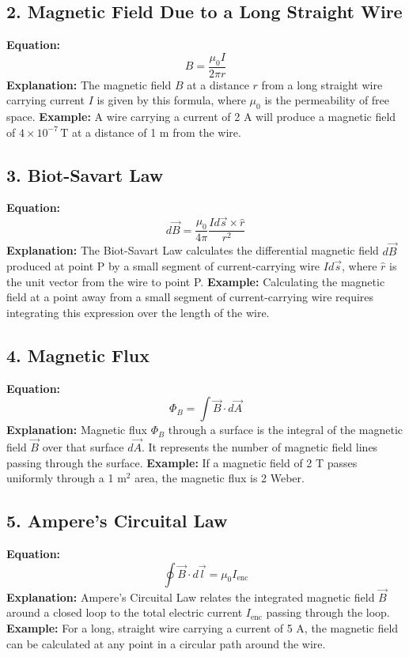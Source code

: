 \documentclass{article}
\begin{document}
\subsection*{2. Magnetic Field Due to a Long Straight Wire}
\textbf{Equation:} 
\[ B = \frac{\mu_0 I}{2\pi r} \]
\textbf{Explanation:} 
The magnetic field \( B \) at a distance \( r \) from a long straight wire carrying current \( I \) is given by this formula, where \( \mu_0 \) is the permeability of free space.
\textbf{Example:}
A wire carrying a current of 2 A will produce a magnetic field of \( 4 \times 10^{-7} \, \text{T} \) at a distance of 1 m from the wire.

\subsection*{3. Biot-Savart Law}
\textbf{Equation:} 
\[ d\vec{B} = \frac{\mu_0}{4\pi} \frac{Id\vec{s} \times \hat{r}}{r^2} \]
\textbf{Explanation:} 
The Biot-Savart Law calculates the differential magnetic field \( d\vec{B} \) produced at point P by a small segment of current-carrying wire \( Id\vec{s} \), where \( \hat{r} \) is the unit vector from the wire to point P.
\textbf{Example:}
Calculating the magnetic field at a point away from a small segment of current-carrying wire requires integrating this expression over the length of the wire.

\subsection*{4. Magnetic Flux}
\textbf{Equation:} 
\[ \Phi_B = \int \vec{B} \cdot d\vec{A} \]
\textbf{Explanation:} 
Magnetic flux \( \Phi_B \) through a surface is the integral of the magnetic field \( \vec{B} \) over that surface \( d\vec{A} \). It represents the number of magnetic field lines passing through the surface.
\textbf{Example:}
If a magnetic field of 2 T passes uniformly through a 1 \( \text{m}^2 \) area, the magnetic flux is 2 Weber.

\subsection*{5. Ampere's Circuital Law}
\textbf{Equation:} 
\[ \oint \vec{B} \cdot d\vec{l} = \mu_0 I_{\text{enc}} \]
\textbf{Explanation:} 
Ampere's Circuital Law relates the integrated magnetic field \( \vec{B} \) around a closed loop to the total electric current \( I_{\text{enc}} \) passing through the loop.
\textbf{Example:}
For a long, straight wire carrying a current of 5 A, the magnetic field can be calculated at any point in a circular path around the wire.
\end{document}

